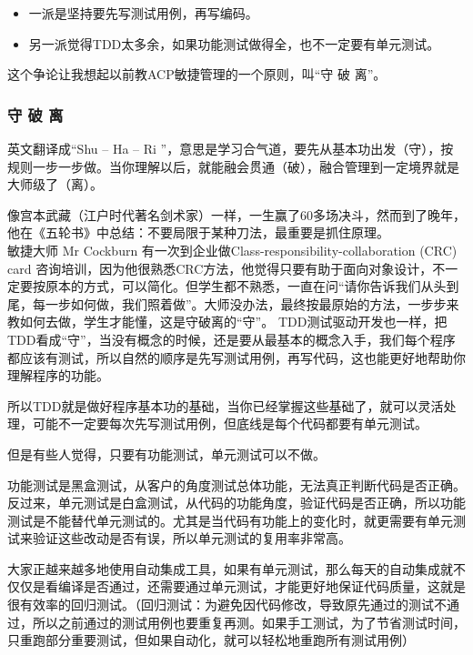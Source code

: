 \begin{itemize}
\tightlist
\item
  一派是坚持要先写测试用例，再写编码。
\item
  另一派觉得TDD太多余，如果功能测试做得全，也不一定要有单元测试。
\end{itemize}

这个争论让我想起以前教ACP敏捷管理的一个原则，叫``守 破 离''。

\hypertarget{ux5b88-ux7834-ux79bb}{%
\subsubsection{守 破 离}\label{ux5b88-ux7834-ux79bb}}

英文翻译成“Shu – Ha – Ri ”，意思是学习合气道，要先从基本功出发（守），按规则一步一步做。当你理解以后，就能融会贯通（破），融合管理到一定境界就是大师级了（离）。

像宫本武藏（江户时代著名剑术家）一样，一生赢了60多场决斗，然而到了晚年，他在《五轮书》中总结：不要局限于某种刀法，最重要是抓住原理。\\

敏捷大师 Mr Cockburn 有一次到企业做Class-responsibility-collaboration (CRC) card 咨询培训，因为他很熟悉CRC方法，他觉得只要有助于面向对象设计，不一定要按原本的方式，可以简化。但学生都不熟悉，一直在问“请你告诉我们从头到尾，每一步如何做，我们照着做”。大师没办法，最终按最原始的方法，一步步来教如何去做，学生才能懂，这是守破离的“守”。
TDD测试驱动开发也一样，把TDD看成``守''，当没有概念的时候，还是要从最基本的概念入手，我们每个程序都应该有测试，所以自然的顺序是先写测试用例，再写代码，这也能更好地帮助你理解程序的功能。

所以TDD就是做好程序基本功的基础，当你已经掌握这些基础了，就可以灵活处理，可能不一定要每次先写测试用例，但底线是每个代码都要有单元测试。

但是有些人觉得，只要有功能测试，单元测试可以不做。

功能测试是黑盒测试，从客户的角度测试总体功能，无法真正判断代码是否正确。反过来，单元测试是白盒测试，从代码的功能角度，验证代码是否正确，所以功能测试是不能替代单元测试的。尤其是当代码有功能上的变化时，就更需要有单元测试来验证这些改动是否有误，所以单元测试的复用率非常高。

大家正越来越多地使用自动集成工具，如果有单元测试，那么每天的自动集成就不仅仅是看编译是否通过，还需要通过单元测试，才能更好地保证代码质量，这就是很有效率的回归测试。（回归测试：为避免因代码修改，导致原先通过的测试不通过，所以之前通过的测试用例也要重复再测。如果手工测试，为了节省测试时间，只重跑部分重要测试，但如果自动化，就可以轻松地重跑所有测试用例）

